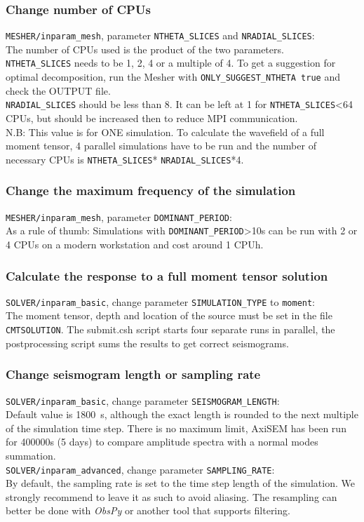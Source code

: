 \documentclass[11pt,letter,fleqn,english,notitlepage]{article}
\begin{document}
\subsubsection{Change number of CPUs}
\verb|MESHER/inparam_mesh|, parameter \verb|NTHETA_SLICES| and \verb|NRADIAL_SLICES|: \\
The number of CPUs used is the product of the two parameters. \\
\verb|NTHETA_SLICES| needs to be 1, 2, 4 or a multiple of 4. To get a suggestion for optimal decomposition, run the Mesher with \verb|ONLY_SUGGEST_NTHETA true| and check the OUTPUT file.\\
\verb|NRADIAL_SLICES| should be less than 8. It can be left at 1 for \verb|NTHETA_SLICES|<64 CPUs, but should be increased then to reduce MPI communication.\\
N.B: This value is for ONE simulation. To calculate the wavefield of a full moment tensor, 4 parallel simulations have to be run and the number of necessary CPUs is \verb|NTHETA_SLICES|* \verb|NRADIAL_SLICES|*4. 
\subsubsection{Change the maximum frequency of the simulation}
\verb|MESHER/inparam_mesh|, parameter \verb|DOMINANT_PERIOD|: \\
As a rule of thumb: Simulations with \verb|DOMINANT_PERIOD|>10s can be run with 2 or 4 CPUs on a modern workstation and cost around 1 CPUh.
\subsubsection{Calculate the response to a full moment tensor solution}
\verb|SOLVER/inparam_basic|, change parameter \verb|SIMULATION_TYPE| to \verb|moment|:\\
The moment tensor, depth and location of the source must be set in the file \verb|CMTSOLUTION|. The submit.csh script starts four separate runs in parallel, the postprocessing script sums the results to get correct seismograms.
\subsubsection{Change seismogram length or sampling rate}
\verb|SOLVER/inparam_basic|, change parameter \verb|SEISMOGRAM_LENGTH|:\\
Default value is 1800~s, although the exact length is rounded to the next multiple of the simulation time step. There is no maximum limit, AxiSEM has been run for 400000s (5 days) to compare amplitude spectra with a normal modes summation.\\
\verb|SOLVER/inparam_advanced|, change parameter \verb|SAMPLING_RATE|:\\
By default, the sampling rate is set to the time step length of the simulation. We strongly recommend to leave it as such to avoid aliasing. The resampling can better be done with \textit{ObsPy} or another tool that supports filtering.
\end{document}

